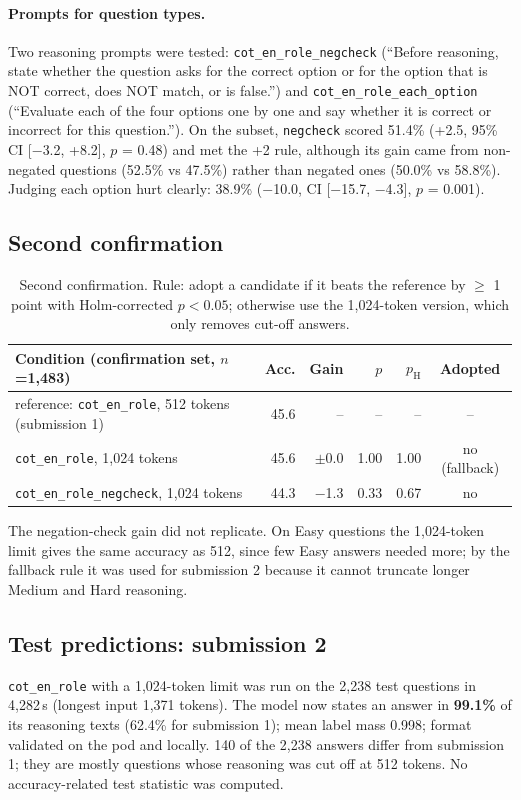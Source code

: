 \documentclass[10pt,a4paper]{article}
\newcommand{\cond}[1]{\texttt{#1}}
\begin{document}
\paragraph{Prompts for question types.} Two reasoning prompts were tested: \cond{cot\_en\_role\_negcheck} (``Before
reasoning, state whether the question asks for the correct option or for the option that is NOT correct, does NOT
match, or is false.'') and \cond{cot\_en\_role\_each\_option} (``Evaluate each of the four options one by one and say
whether it is correct or incorrect for this question.''). On the subset, \cond{negcheck} scored 51.4\% (+2.5,
95\% CI [$-$3.2, +8.2], $p$ = 0.48) and met the +2 rule, although its gain came from non-negated questions (52.5\% vs
47.5\%) rather than negated ones (50.0\% vs 58.8\%). Judging each option hurt clearly: 38.9\% ($-$10.0, CI [$-$15.7,
$-$4.3], $p$ = 0.001).

\subsection{Second confirmation}
\begin{table}[h]
\centering\footnotesize\setlength{\tabcolsep}{4pt}
\begin{tabular}{lrrrrc}
\toprule
Condition (confirmation set, $n$=1,483) & Acc. & Gain & $p$ & $p_\text{H}$ & Adopted\\
\midrule
reference: \cond{cot\_en\_role}, 512 tokens (submission 1) & 45.6 & -- & -- & -- & --\\
\cond{cot\_en\_role}, 1,024 tokens & 45.6 & $\pm$0.0 & 1.00 & 1.00 & no (fallback)\\
\cond{cot\_en\_role\_negcheck}, 1,024 tokens & 44.3 & $-$1.3 & 0.33 & 0.67 & no\\
\bottomrule
\end{tabular}
\caption{Second confirmation. Rule: adopt a candidate if it beats the reference by $\ge$ 1 point with Holm-corrected
$p<0.05$; otherwise use the 1,024-token version, which only removes cut-off answers.}
\label{tab:confirm2}
\end{table}

The negation-check gain did not replicate. On Easy questions the 1,024-token limit gives the same accuracy as 512,
since few Easy answers needed more; by the fallback rule it was used for submission 2 because it cannot truncate
longer Medium and Hard reasoning.

\subsection{Test predictions: submission 2}
\cond{cot\_en\_role} with a 1,024-token limit was run on the 2,238 test questions in 4,282\,s (longest input 1,371
tokens). The model now states an answer in \textbf{99.1\%} of its reasoning texts (62.4\% for submission 1); mean label
mass 0.998; format validated on the pod and locally. 140 of the 2,238 answers differ from submission 1; they are
mostly questions whose reasoning was cut off at 512 tokens. No accuracy-related test statistic was computed.
\end{document}
